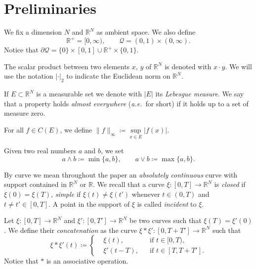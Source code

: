\documentclass[11pt,a4paper,american]{article}
\newcommand{\Qcal}{\mathcal Q}
\newcommand{\Rds}{\mathds R}
\begin{document}
    \section{Preliminaries}\label{prelimsec}

    We fix a dimension $N$ and $\Rds^N$ as ambient space. We also define
    \begin{equation*}
        \Rds^+=[0,\infty),\qquad\Qcal=(0,1)\times(0,\infty).
    \end{equation*}
    Notice that $\partial\Qcal=\{0\}\times[0,1]\cup\Rds^+\times\{0,1\}$.

    The scalar product between two elements $x$, $y$ of $\Rds^N$ is denoted with $x\cdot y$. We will use the notation $|\cdot|_2$ to indicate the Euclidean norm on $\Rds^N$.

    If $E\subset\Rds^N$ is a measurable set we denote with $|E|$ its \emph{Lebesgue measure}. We say that a property holds \emph{almost everywhere} (\emph{a.e.}\ for short) if it holds up to a set of measure zero.

    For all $f\in C(E)$, we define $\|f\|_\infty\coloneqq\sup\limits_{x\in E}|f(x)|$.

    Given two real numbers $a$ and $b$, we set
    \begin{equation*}
        a\wedge b\coloneqq\min\{a,b\},\qquad a\vee b\coloneqq\max\{a,b\}.
    \end{equation*}

    By curve we mean throughout the paper an \emph{absolutely continuous} curve with support contained in $\Rds^N$ or $\Rds$. We recall that a curve $\xi:[0,T]\to\Rds^N$ is \emph{closed} if $\xi(0)=\xi(T)$, \textit{simple} if $\xi(t)\ne\xi(t')$ whenever $t\in(0,T)$ and $t\ne t'\in[0,T]$. A point in the support of $\xi$ is called \emph{incident} to $\xi$.

    Let $\xi:[0,T]\to\Rds^N$ and $\xi':[0,T']\to\Rds^N$ be two curves such that $\xi(T)=\xi'(0)$. We define their \emph{concatenation} as the curve $\xi*\xi':[0,T+T']\to\Rds^N$ such that
    \begin{equation*}
        \xi*\xi'(t)\coloneqq\left\{
        \begin{aligned}
            &\xi(t),&&\text{if }t\in[0,T),\\
            &\xi'(t-T),&&\text{if }t\in\left[T,T+T'\right].
        \end{aligned}
        \right.
    \end{equation*}
    Notice that $*$ is an associative operation.
\end{document}
